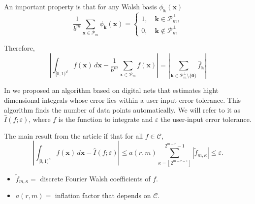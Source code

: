 \documentclass[]{elsarticle}
\theoremstyle{definition}
\newcommand{\cube}{[0,1)^d}
\newcommand{\bvec}[1]{\boldsymbol{#1}}
\newcommand{\vx}{\bvec{x}}
\newcommand{\vk}{\bvec{k}}
\newcommand{\hf}{\hat{f}}
\newcommand{\tf}{\tilde{f}}
\newcommand{\vzero}{\bvec{0}}
\def\abs#1{\ensuremath{\left \lvert #1 \right \rvert}}
\begin{document}
An important property is that for any Walsh basis $\phi_{\vk}(\vx)$
\[
\frac{1}{b^m}\sum_{\vx\in\mathcal{P}_m}\phi_{\vk}(\vx)=
\begin{cases}
1,\quad \vk\in\mathcal{P}_m^\perp, \\
0,\quad \vk\notin\mathcal{P}_m^\perp
\end{cases}
\]

Therefore,
\[
\abs{\int_{\cube} f(\vx)\,d\vx - \frac{1}{b^m}\sum_{\vx\in\mathcal{P}_m}f(\vx)}=\abs{\sum_{\vk\in\mathcal{P}_m^\perp\setminus\{\vzero\}}\hf_{\vk}}
\]

In \cite{HicJim} we proposed an algorithm based on digital nets that estimates hight dimensional integrals whose error lies within a user-input error tolerance. This algorithm finds the number of data points automatically. We will refer to it as $\widehat{I}(f;\varepsilon)$, where $f$ is the function to integrate and $\varepsilon$ the user-input error tolerance.

The main result from the article if that for all $f\in\mathcal{C}$,
\[
\abs{\int_{\cube} f(\vx)\,d\vx - \widehat{I}(f;\varepsilon)}\leq a(r,m)\sum_{\kappa=\left \lfloor 2^{m-r-1}\right \rfloor}^{2^{m-r}-1} \abs{\tf_{m,\kappa}}\leq \varepsilon.
\]
\begin{itemize}
\item $\tf_{m,\kappa}=$ discrete Fourier Walsh coefficients of $f$.
\item $a(r,m)=$ inflation factor that depends on $\mathcal{C}$.
\end{itemize}
\end{document}
